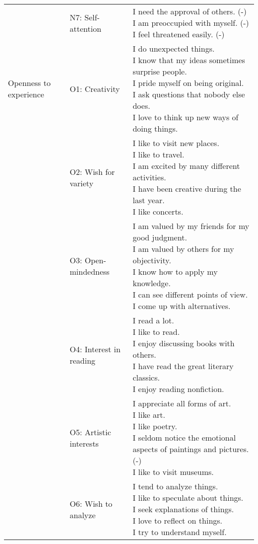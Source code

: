 \begin{appendix}
\begin{longtable}[t]{lll}
\addlinespace
 & N7: Self-attention & \makecell[l]{I need the approval of others. (-)\\I am preoccupied with myself. (-)\\I feel threatened easily. (-)}\\
\addlinespace
Openness to experience & O1: Creativity & \makecell[l]{I do unexpected things.\\I know that my ideas sometimes surprise people.\\I pride myself on being original.\\I ask questions that nobody else does.\\I love to think up new ways of doing things.}\\
\addlinespace
 & O2: Wish for variety & \makecell[l]{I like to visit new places.\\I like to travel.\\I am excited by many different activities.\\I have been creative during the last year.\\I like concerts.}\\
\addlinespace
 & O3: Open-mindedness & \makecell[l]{I am valued by my friends for my good judgment.\\I am valued by others for my objectivity.\\I know how to apply my knowledge.\\I can see different points of view.\\I come up with alternatives.}\\
\addlinespace
 & O4: Interest in reading & \makecell[l]{I read a lot.\\I like to read.\\I enjoy discussing books with others.\\I have read the great literary classics.\\I enjoy reading nonfiction.}\\
\addlinespace
 & O5: Artistic interests & \makecell[l]{I appreciate all forms of art.\\I like art.\\I like poetry.\\I seldom notice the emotional aspects of paintings and pictures. (-)\\I like to visit museums.}\\
\addlinespace
 & O6: Wish to analyze & \makecell[l]{I tend to analyze things.\\I like to speculate about things.\\I seek explanations of things.\\I love to reflect on things.\\I try to understand myself.}\\

\end{longtable}
\end{appendix}
